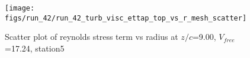 \begin{figure}[H]
\centering
\texttt{[image: figs/run\_42/run\_42\_turb\_visc\_ettap\_top\_vs\_r\_mesh\_scatter]}
\caption{Scatter plot of reynolds stress term vs radius at $z/c$=9.00, $V_{free}$=17.24, station5}
\label{fig:run_42_turb_visc_ettap_top_vs_r_mesh_scatter}
\end{figure}


